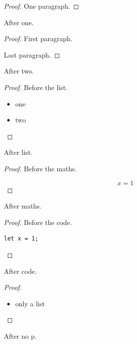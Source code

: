 \begin{proof}
One paragraph.
\end{proof}

After one.

\begin{proof}
First paragraph.

Last paragraph.
\end{proof}

After two.

\begin{proof}
Before the list.

\begin{itemize}
\item one
\item two
\end{itemize}
\end{proof}

After list.

\begin{proof}
Before the maths.

$$
x = 1
$$
\end{proof}

After maths.

\begin{proof}
Before the code.

\begin{verbatim}
let x = 1;
\end{verbatim}
\end{proof}

After code.

\begin{proof}
\begin{itemize}
\item only a list
\end{itemize}
\end{proof}

After no p.

